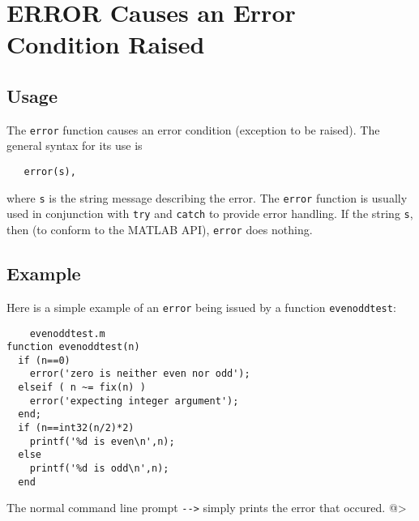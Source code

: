 \section{ERROR Causes an Error Condition Raised}

\subsection{Usage}

The \verb|error| function causes an error condition (exception
to be raised).  The general syntax for its use is
\begin{verbatim}
   error(s),
\end{verbatim}
where \verb|s| is the string message describing the error.  The
\verb|error| function is usually used in conjunction with \verb|try|
and \verb|catch| to provide error handling.  If the string \verb|s|,
then (to conform to the MATLAB API), \verb|error| does nothing.
\subsection{Example}

Here is a simple example of an \verb|error| being issued by a function
\verb|evenoddtest|:
\begin{verbatim}
    evenoddtest.m
function evenoddtest(n)
  if (n==0)
    error('zero is neither even nor odd');
  elseif ( n ~= fix(n) )
    error('expecting integer argument');
  end;
  if (n==int32(n/2)*2)
    printf('%d is even\n',n);
  else
    printf('%d is odd\n',n);
  end
\end{verbatim}
The normal command line prompt \verb|-->| simply prints the error
that occured.
@>
